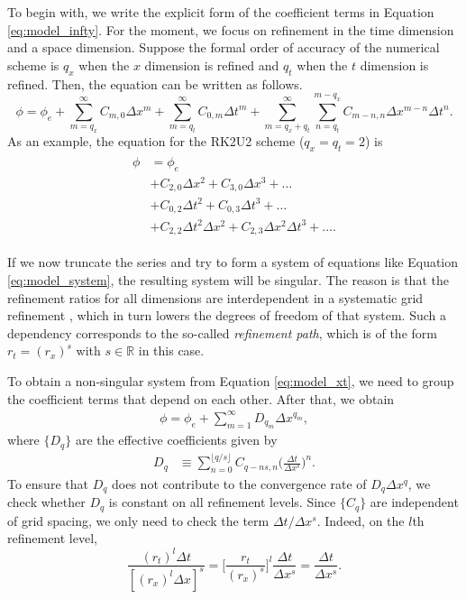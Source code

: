 To begin with, we write the explicit form of the coefficient terms in Equation \ref{eq:model_infty}. For the moment, we focus on refinement in the time dimension and a space dimension. Suppose the formal order of accuracy of the numerical scheme is $q_x$ when the $x$ dimension is refined and $q_t$ when the $t$ dimension is refined. Then, the equation can be written as follows.
\begin{equation} \label{eq:model_xt}
    \phi = \phi_{e} + \sum_{m=q_x}^{\infty} C_{m,0}\Delta x^{m} + \sum_{m=q_t}^{\infty} C_{0,m}\Delta t^{m} + \sum_{m=q_x+q_t}^{\infty} \sum_{n=q_t}^{m-q_x} C_{m-n,n}\Delta x^{m-n}\Delta t^{n}.
\end{equation}
As an example, the equation for the RK2U2 scheme ($q_x=q_t=2$) is
\begin{align} \label{eq:model_RK2U2_infty}
\begin{split}
    \phi &= \phi_{e} \\
    &+ C_{2,0}\Delta x^{2} + C_{3,0}\Delta x^{3} + \dots \\
    &+ C_{0,2}\Delta t^{2} + C_{0,3}\Delta t^{3} + \dots \\
    &+ C_{2,2}\Delta t^{2}\Delta x^{2} + C_{2,3}\Delta x^{2}\Delta t^{3} + \dots.
\end{split}
\end{align}

If we now truncate the series and try to form a system of equations like Equation \ref{eq:model_system}, the resulting system will be singular. The reason is that the refinement ratios for all dimensions are interdependent in a systematic grid refinement \citep{Roy2010}, which in turn lowers the degrees of freedom of that system. Such a dependency corresponds to the so-called \textit{refinement path}, which is of the form $r_t = (r_x)^s$ with $s \in \mathbb{R}$ in this case.

To obtain a non-singular system from Equation \ref{eq:model_xt}, we need to group the coefficient terms that depend on each other. After that, we obtain
\begin{align} \label{eq:model_path_infty}
    \phi = \phi_{e} + \sum_{m=1}^{\infty} D_{q_m} \Delta x^{q_m},
\end{align}
where $\{D_q\}$ are the effective coefficients given by
\begin{align}
    D_{q} &\equiv \sum_{n=0}^{\lfloor q/s \rfloor} C_{q-ns,n} \Big( \frac{\Delta t}{\Delta x^s} \Big)^{n}.
\end{align}
To ensure that $D_q$ does not contribute to the convergence rate of $D_q \Delta x^q$, we check whether $D_q$ is constant on all refinement levels. Since $\{C_q\}$ are independent of grid spacing, we only need to check the term $\Delta t / \Delta x^s$. Indeed, on the $l$th refinement level,
\begin{equation}
    \frac{(r_t)^l \Delta t}{[(r_x)^{l} \Delta x]^s} = \bigg[ \frac{r_t}{(r_x)^s} \bigg]^l \frac{\Delta t}{\Delta x^s} = \frac{\Delta t}{\Delta x^s}.
\end{equation}


